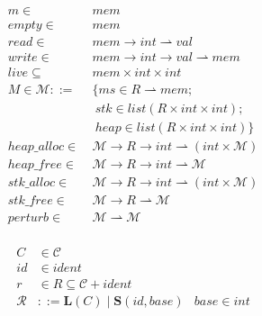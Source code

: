 \documentclass{article}
\begin{document}
\begin{figure}
  \begin{minipage}[t]{0.5\textwidth}
    \vspace{0em}
    \[\begin{split}
    m \in ~ & \mathit{mem} \\
    \mathit{empty} \in ~ & \mathit{mem} \\
    \mathit{read} \in ~ & \mathit{mem} \rightarrow \mathit{int} \rightharpoonup \mathit{val} \\
    \mathit{write} \in ~ & \mathit{mem} \rightarrow \mathit{int} \rightarrow \mathit{val}
    \rightharpoonup \mathit{mem} \\
    \mathit{live} \subseteq ~ & \mathit{mem} \times \mathit{int} \times \mathit{int} \\
    M \in \mathcal{M} ::= ~ & \{
    ms \in R \rightharpoonup \mathit{mem}; \\
    & ~ stk \in list (R \times \mathit{int} \times \mathit{int}); \\
    & ~ heap \in list (R \times \mathit{int} \times \mathit{int})
    \} \\
    \mathit{heap\_alloc} \in ~ & \mathcal{M} \rightarrow R \rightarrow \mathit{int} \rightharpoonup
    (\mathit{int} \times \mathcal{M}) \\
    \mathit{heap\_free} \in ~ & \mathcal{M} \rightarrow R \rightarrow \mathit{int} \rightharpoonup
    \mathcal{M} \\
    \mathit{stk\_alloc} \in ~ & \mathcal{M} \rightarrow R \rightarrow
    \mathit{int} \rightharpoonup (\mathit{int} \times \mathcal{M}) \\
    \mathit{stk\_free} \in ~ & \mathcal{M} \rightarrow R \rightharpoonup
    \mathcal{M} \\
    \mathit{perturb} \in ~ & \mathcal{M} \rightharpoonup \mathcal{M} \\
    \end{split}\]
  \end{minipage}
  \begin{minipage}[t]{0.49\textwidth}
    \vspace{0em}
    \[\begin{aligned}
    C & \in \mathcal{C} \\
    id & \in \mathit{ident} \\
    r & \in R \subseteq \mathcal{C} + \mathit{ident} \\
    \mathcal{R} & ::= \mathbf{L}(C) \mid \mathbf{S}(id, \mathit{base}) &
    \mathit{base} \in \mathit{int} \\

\end{aligned}\]
\end{minipage}
\end{figure}
\end{document}
